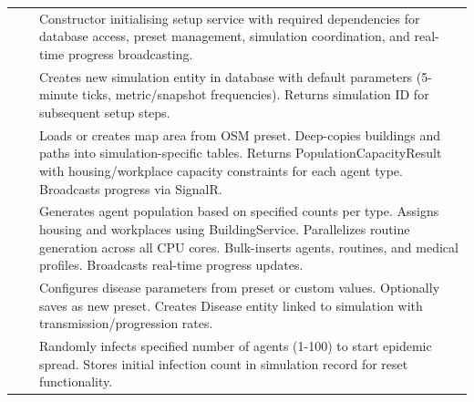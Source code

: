 \begin{longtable}{|L{4cm}|L{4cm}|L{6cm}|}
 & 
 & 
Constructor initialising setup service with required dependencies for database access, preset management, simulation coordination, and real-time progress broadcasting. \\
&  & 
Creates new simulation entity in database with default parameters (5-minute ticks, metric/snapshot frequencies). Returns simulation ID for subsequent setup steps. \\
&  & 
Loads or creates map area from OSM preset. Deep-copies buildings and paths into simulation-specific tables. Returns PopulationCapacityResult with housing/workplace capacity constraints for each agent type. Broadcasts progress via SignalR. \\
&  & 
Generates agent population based on specified counts per type. Assigns housing and workplaces using BuildingService. Parallelizes routine generation across all CPU cores. Bulk-inserts agents, routines, and medical profiles. Broadcasts real-time progress updates. \\
&  & 
Configures disease parameters from preset or custom values. Optionally saves as new preset. Creates Disease entity linked to simulation with transmission/progression rates. \\
&  & 
Randomly infects specified number of agents (1-100) to start epidemic spread. Stores initial infection count in simulation record for reset functionality. \\
\hline


\end{longtable}
